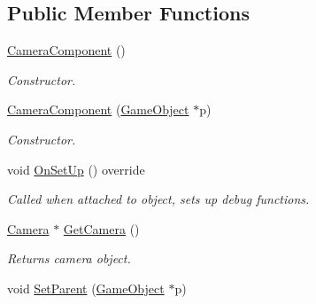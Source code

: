 \subsection*{Public Member Functions}
\begin{DoxyCompactItemize}
\item 
\hypertarget{class_camera_component_a6f14fb3dfa5ca8cfbaae2936413837d8}{\hyperlink{class_camera_component_a6f14fb3dfa5ca8cfbaae2936413837d8}{Camera\+Component} ()}\label{class_camera_component_a6f14fb3dfa5ca8cfbaae2936413837d8}

\begin{DoxyCompactList}\small\item\em Constructor. \end{DoxyCompactList}\item 
\hypertarget{class_camera_component_ac13478a138aae597e2a2383a23809993}{\hyperlink{class_camera_component_ac13478a138aae597e2a2383a23809993}{Camera\+Component} (\hyperlink{class_game_object}{Game\+Object} $\ast$p)}\label{class_camera_component_ac13478a138aae597e2a2383a23809993}

\begin{DoxyCompactList}\small\item\em Constructor. \end{DoxyCompactList}\item 
\hypertarget{class_camera_component_acd54d4b23d9005e9774f1c18e5a770f4}{void \hyperlink{class_camera_component_acd54d4b23d9005e9774f1c18e5a770f4}{On\+Set\+Up} () override}\label{class_camera_component_acd54d4b23d9005e9774f1c18e5a770f4}

\begin{DoxyCompactList}\small\item\em Called when attached to object, sets up debug functions. \end{DoxyCompactList}\item 
\hypertarget{class_camera_component_a1dfd5d80dc742c0f5b4ffdee800ef65c}{\hyperlink{class_camera}{Camera} $\ast$ \hyperlink{class_camera_component_a1dfd5d80dc742c0f5b4ffdee800ef65c}{Get\+Camera} ()}\label{class_camera_component_a1dfd5d80dc742c0f5b4ffdee800ef65c}

\begin{DoxyCompactList}\small\item\em Returns camera object. \end{DoxyCompactList}\item 
\hypertarget{class_camera_component_a7c539add4157eec66586dd6f9c8e6484}{void \hyperlink{class_camera_component_a7c539add4157eec66586dd6f9c8e6484}{Set\+Parent} (\hyperlink{class_game_object}{Game\+Object} $\ast$p)}\label{class_camera_component_a7c539add4157eec66586dd6f9c8e6484}


\end{DoxyCompactItemize}
